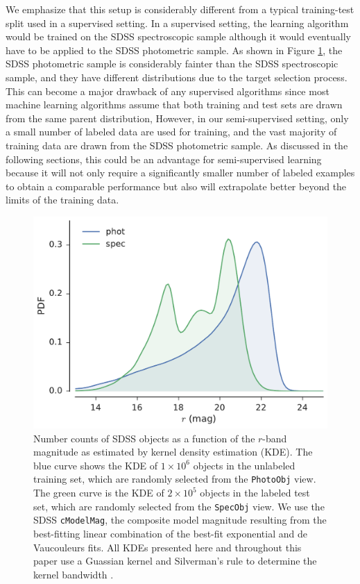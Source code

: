 \documentclass[fleqn,usenatbib]{mnras}
\begin{document}
We emphasize that this setup is considerably different from a typical training-test split used in a supervised setting.
In a supervised setting, the learning algorithm would be trained on the SDSS spectroscopic sample
although it would eventually have to be applied to the SDSS photometric sample.
As shown in Figure \ref{fig:spec_phot}, the SDSS photometric sample is considerably fainter than the SDSS spectroscopic sample,
and they have different distributions due to the target selection process.
This can become a major drawback of any supervised algorithms since most machine learning algorithms assume that both
training and test sets are drawn from the same parent distribution,
However, in our semi-supervised setting, only a small number of labeled data are used for training,
and the vast majority of training data are drawn from the SDSS photometric sample.
As discussed in the following sections, this could be an advantage for semi-supervised learning because
it will not only require a significantly smaller number of labeled examples to obtain a comparable performance
but also will extrapolate better beyond the limits of the training data.


\begin{figure}
  \centering
  \includegraphics[width=\columnwidth]{figures/spec_phot.pdf}
  \caption{
    Number counts of SDSS objects as a function of the $r$-band magnitude as estimated by kernel density estimation (KDE).
    The blue curve shows the KDE of $1 \times 10^6$ objects in the unlabeled training set,
    which are randomly selected from the \texttt{PhotoObj} view.
    The green curve is the KDE of $2 \times 10^5$ objects in the labeled test set,
    which are randomly selected from the \texttt{SpecObj} view.
    We use the SDSS \texttt{cModelMag}, the composite model magnitude resulting from the best-fitting linear combination
    of the best-fit exponential and de Vaucouleurs fits.
    All KDEs presented here and throughout this paper use a Guassian kernel and Silverman's rule to determine
    the kernel bandwidth \citep{silverman1986density}.
  }
  \label{fig:spec_phot}
\end{figure}
\end{document}
